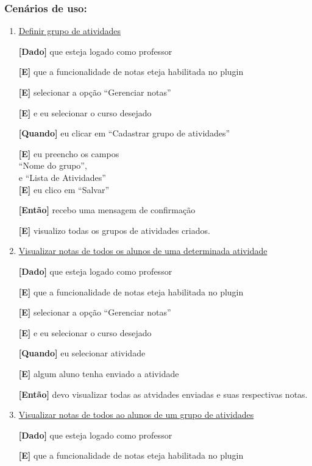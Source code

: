 \begin{enumerate}
\subsubsection*{Cenários de uso:}

\begin{enumerate}

\item \underline{Definir grupo de atividades}

\textbf{[Dado]} que esteja logado como professor

\textbf{[E]} que a funcionalidade de notas eteja habilitada no plugin

\textbf{[E]} selecionar a opção ``Gerenciar notas''

\textbf{[E]} e eu selecionar o curso desejado

\textbf{[Quando]} eu clicar em ``Cadastrar grupo de atividades''

\textbf{[E]} eu preencho os campos \\
``Nome do grupo'',\\
e ``Lista de Atividades''\\
\textbf{[E]} eu clico em ``Salvar''

\textbf{[Então]} recebo uma mensagem de confirmação

\textbf{[E]} visualizo todas os grupos de atividades criados.

\item \underline{Visualizar notas de todos os alunos de uma determinada atividade}

\textbf{[Dado]} que esteja logado como professor

\textbf{[E]} que a funcionalidade de notas eteja habilitada no plugin

\textbf{[E]} selecionar a opção ``Gerenciar notas''

\textbf{[E]} e eu selecionar o curso desejado

\textbf{[Quando]} eu selecionar atividade

\textbf{[E]} algum aluno tenha enviado a atividade

\textbf{[Então]} devo visualizar todas as atvidades enviadas e suas respectivas notas.

\item \underline{Visualizar notas de todos ao alunos de um grupo de atividades}

\textbf{[Dado]} que esteja logado como professor

\textbf{[E]} que a funcionalidade de notas eteja habilitada no plugin


\end{enumerate}
\end{enumerate}

